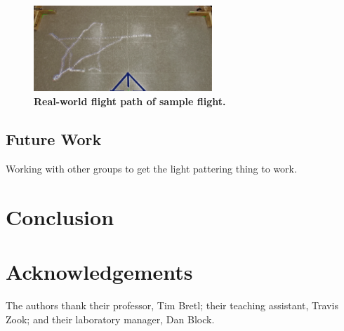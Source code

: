 \documentclass[conf]{new-aiaa}
\begin{document}
        \begin{figure}[H]
        \centering
        \includegraphics[width=0.6\textwidth]{docs/reports/Final Project Update/images/real_flight_path.png}
        \caption{\textbf{Real-world flight path of sample flight.}}
        \label{fig:drawn_flight}
        \end{figure}

    \subsection{Future Work} %
    
        Working with other groups to get the light pattering thing to work.
        

\section{Conclusion}

\section{Acknowledgements}
    The authors thank their professor, Tim Bretl; their teaching assistant, Travis Zook; and their laboratory manager, Dan Block.


\end{document}
